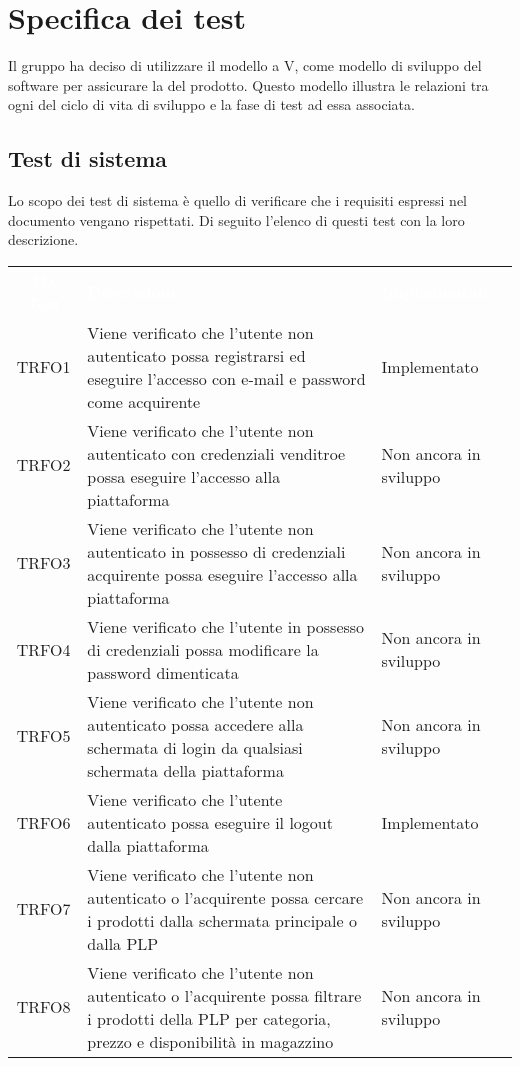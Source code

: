 \section{Specifica dei test}
\label{specificatest}
Il gruppo ha deciso di utilizzare il modello a V, come modello di sviluppo del software per assicurare la  del prodotto. Questo modello illustra le relazioni tra ogni  del ciclo di vita di sviluppo e la fase di test ad essa associata.
\subsection{Test di sistema}
Lo scopo dei test di sistema è quello di verificare che i requisiti espressi nel documento \AdR{} vengano rispettati. Di seguito l'elenco di questi test con la loro descrizione.
\begin{longtable}{|c| C{10cm} |C{3cm}|}
	\textcolor{white}{\textbf{ID Test}}&
	\textcolor{white}{\textbf{Descrizione}}&
	\textcolor{white}{\textbf{Implementato}}\label{tab:TestSistema1}\\
	TRFO1 & Viene verificato che l'utente non autenticato possa registrarsi ed eseguire l'accesso  con e-mail e password come acquirente & Implementato\\ \hline
	TRFO2 & Viene verificato che l'utente non autenticato con credenziali venditroe possa eseguire l'accesso alla piattaforma & Non ancora in sviluppo\\ \hline
	TRFO3 & Viene verificato che l'utente non autenticato in possesso di credenziali acquirente possa eseguire l'accesso alla piattaforma & Non ancora in sviluppo \\ \hline
	TRFO4 & Viene verificato che l'utente in possesso di credenziali possa modificare la password dimenticata & Non ancora in sviluppo\\ \hline
	TRFO5 & Viene verificato che l'utente non autenticato possa accedere alla schermata di login da qualsiasi schermata della piattaforma & Non ancora in sviluppo\\ \hline
	TRFO6 & Viene verificato che l'utente autenticato possa eseguire il logout dalla piattaforma & Implementato\\ \hline
	TRFO7 & Viene verificato che l'utente non autenticato o l'acquirente possa cercare i prodotti dalla schermata principale o dalla PLP & Non ancora in sviluppo\\ \hline
	TRFO8 & Viene verificato che l'utente non autenticato o l'acquirente possa filtrare i prodotti della PLP per categoria, prezzo e disponibilità in magazzino & Non ancora in sviluppo\\ \hline

\end{longtable}
